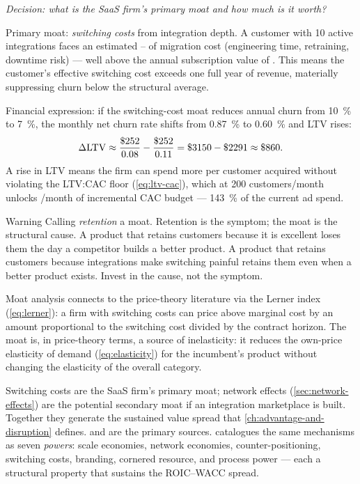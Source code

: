 \begin{example}
\emph{Decision: what is the SaaS firm's primary moat and how much is it worth?}

Primary moat: \emph{switching costs} from integration depth. A customer with 10 active
integrations faces an estimated -- of migration cost
(engineering time, retraining, downtime risk) --- well above the annual subscription value
of . This means the customer's effective switching cost exceeds one full year of
revenue, materially suppressing churn below the structural average.

Financial expression: if the switching-cost moat reduces annual churn from
\qty{10}{\percent} to \qty{7}{\percent}, the monthly net churn rate shifts from
\qty{0.87}{\percent} to \qty{0.60}{\percent} and LTV rises:
\[
  \Delta\mathrm{LTV} \approx \frac{\$\num{252}}{0.08} - \frac{\$\num{252}}{0.11}
                           = \$\num{3150} - \$\num{2291} \approx \$\num{860}.
\]
A  rise in LTV means the firm can spend  more per customer acquired
without violating the LTV:CAC floor (\cref{eq:ltv-cac}), which at 200 customers/month
unlocks /month of incremental CAC budget --- \qty{143}{\percent} of the
current ad spend.
\end{example}

\begin{admonition}{Warning}
Calling \emph{retention} a moat. Retention is the symptom; the moat is the structural
cause. A product that retains customers because it is excellent loses them the day a
competitor builds a better product. A product that retains customers because integrations
make switching painful retains them even when a better product exists. Invest in the cause,
not the symptom.
\end{admonition}

Moat analysis connects to the price-theory literature via the Lerner index
(\cref{eq:lerner}): a firm with switching costs can price above marginal cost by an amount
proportional to the switching cost divided by the contract horizon. The moat is, in
price-theory terms, a source of inelasticity: it reduces the own-price elasticity of demand
(\cref{eq:elasticity}) for the incumbent's product without changing the elasticity of the
overall category.

Switching costs are the SaaS firm's primary moat; network effects (\cref{sec:network-effects})
are the potential secondary moat if an integration marketplace is built. Together they
generate the sustained value spread that \cref{ch:advantage-and-disruption} defines.
\textcite{porter1985} and \textcite{dranove7theconomics} are the primary sources.
\textcite{helmer2016powers} catalogues the same mechanisms as seven \emph{powers}: scale economies, network economies, counter-positioning, switching costs, branding, cornered resource, and process power --- each a structural property that sustains the ROIC--WACC spread.

